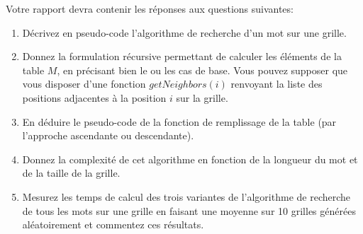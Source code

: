 \documentclass[a4paper,10pt]{article}
\begin{document}
Votre rapport devra contenir les réponses aux questions suivantes:
\begin{enumerate}
\item Décrivez en pseudo-code l'algorithme de recherche d'un mot sur
  une grille.
\item Donnez la formulation récursive permettant de calculer les
  éléments de la table $M$, en précisant bien le ou les cas de
  base. Vous pouvez supposer que vous disposer d'une fonction
  $getNeighbors(i)$ renvoyant la liste des positions adjacentes à la
  position $i$ sur la grille.
\item En déduire le pseudo-code de la fonction de remplissage de la
  table (par l'approche ascendante ou descendante).
\item Donnez la complexité de cet algorithme en fonction de la
  longueur du mot et de la taille de la grille.
\item Mesurez les temps de calcul des trois variantes de l'algorithme
  de recherche de tous les mots sur une grille en faisant une moyenne
  sur 10 grilles générées aléatoirement et commentez ces résultats.
\end{enumerate}
\end{document}
